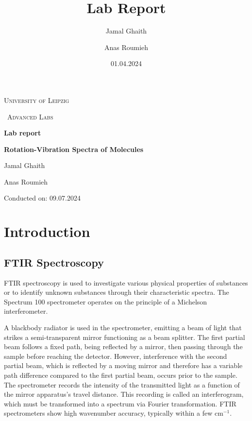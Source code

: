 \documentclass{article}
\title{Lab Report}
\author{Jamal Ghaith}
\author{Anas Roumieh}
\date{01.04.2024}
\begin{document}
\begin{titlepage}
	\centering
	{\scshape\LARGE University of Leipzig \par}
	\vspace{1cm}
	{\scshape\ Advanced Labs\par}
	\vspace{1.5cm}
	{\huge\bfseries Lab report\par}
	\vspace{2cm}
	{\huge\bfseries Rotation-Vibration Spectra of Molecules\par}
	\vspace{2cm}
	{\Large Jamal Ghaith\par}
    {\Large Anas Roumieh\par}
	\vfill

    {\Large Conducted on: 09.07.2024 \par}
	\vfill
\end{titlepage}


\tableofcontents
{}
\pagebreak{}

\section{Introduction}

\subsection{FTIR Spectroscopy}

FTIR spectroscopy is used to investigate various physical properties of substances or to identify unknown substances through their characteristic spectra. The Spectrum 100 spectrometer operates on the principle of a Michelson interferometer.

A blackbody radiator is used in the spectrometer, emitting a beam of light that strikes a semi-transparent mirror functioning as a beam splitter. The first partial beam follows a fixed path, being reflected by a mirror, then passing through the sample before reaching the detector. However, interference with the second partial beam, which is reflected by a moving mirror and therefore has a variable path difference compared to the first partial beam, occurs prior to the sample. The spectrometer records the intensity of the transmitted light as a function of the mirror apparatus's travel distance. This recording is called an interferogram, which must be transformed into a spectrum via Fourier transformation. FTIR spectrometers show high wavenumber accuracy, typically within a few cm\(^{-1}\).
\end{document}
